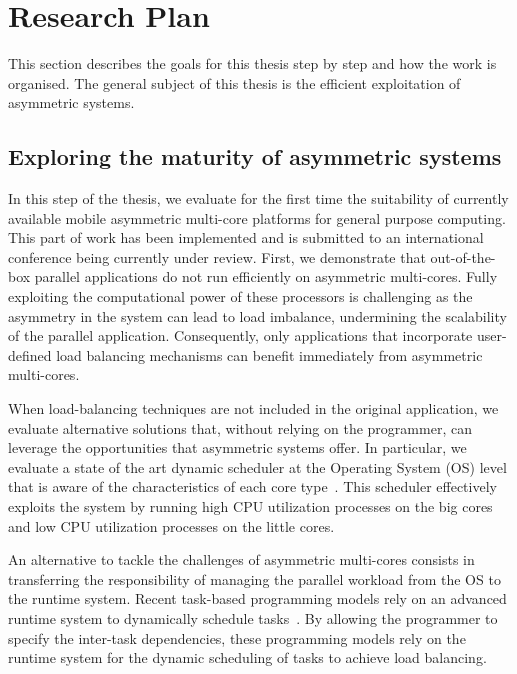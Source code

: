 \chapter{Research Plan}
\label{chapter:plan}
\ifpdf
    \graphicspath{{Chapter4/Figs/Raster/}{Chapter4/Figs/PDF/}{Chapter4/Figs/}}
\else
    \graphicspath{{Chapter4/Figs/Vector/}{Chapter4/Figs/}}
\fi

This section describes the goals for this thesis step by step and how the work is organised.
The general subject of this thesis is the efficient exploitation of asymmetric systems.

\section{Exploring the maturity of asymmetric systems}
\label{sec:asymmetric}
In this step of the thesis, we evaluate for the first time the suitability of currently available mobile asymmetric multi-core platforms for general purpose computing. 
This part of work has been implemented and is submitted to an international conference being currently under review.
First, we demonstrate that out-of-the-box parallel applications do not run efficiently on asymmetric multi-cores. Fully exploiting the computational power of these processors is challenging as the asymmetry in the system can lead to load imbalance, undermining the scalability of the parallel application. Consequently, only applications that incorporate user-defined load balancing mechanisms can benefit immediately from asymmetric multi-cores.

When load-balancing techniques are not included in the original application, we evaluate alternative solutions that, without relying on the programmer, can leverage the opportunities that asymmetric systems offer. In particular, we evaluate a state of the art dynamic scheduler at the Operating System (OS) level that is aware of the characteristics of each core type~\cite{samsung}. This scheduler effectively exploits the system by running high CPU utilization processes on the big cores and low CPU utilization processes on the little cores.

An alternative to tackle the challenges of asymmetric multi-cores consists in transferring the responsibility of managing the parallel workload from the OS to the runtime system. Recent task-based programming models rely on an advanced runtime system to dynamically schedule tasks~\cite{Ayguade:TPDS2009, OpenMP4.0:Manual2013, OmpSs_PPL11, Zuckerman:EXADAPT2011, Bauer.2012.SC, Vandierendonck:PACT2011, Vandierendonck:Hyperq}. By allowing the programmer to specify the inter-task dependencies, these programming models rely on the runtime system for the dynamic scheduling of tasks to achieve load balancing.

